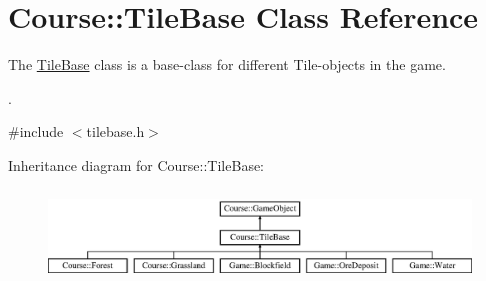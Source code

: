 \hypertarget{classCourse_1_1TileBase}{\section{Course\-:\-:Tile\-Base Class Reference}
\label{classCourse_1_1TileBase}
}


The \hyperlink{classCourse_1_1TileBase}{Tile\-Base} class is a base-\/class for different Tile-\/objects in the game. \par
.  




{\ttfamily \#include $<$tilebase.\-h$>$}

Inheritance diagram for Course\-:\-:Tile\-Base\-:\begin{figure}[H]
\begin{center}
\leavevmode
\includegraphics[height=2.470588cm]{classCourse_1_1TileBase}
\end{center}
\end{figure}
